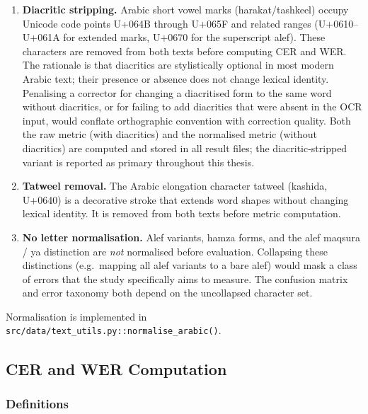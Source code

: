 \begin{enumerate}
  \item \textbf{Diacritic stripping.}
        Arabic short vowel marks (harakat/tashkeel) occupy Unicode code points
        U+064B through U+065F and related ranges (U+0610--U+061A for extended
        marks, U+0670 for the superscript alef).
        These characters are removed from both texts before computing CER and WER.
        The rationale is that diacritics are stylistically optional in most
        modern Arabic text; their presence or absence does not change lexical
        identity.
        Penalising a corrector for changing a diacritised form to the same word
        without diacritics, or for failing to add diacritics that were absent in
        the OCR input, would conflate orthographic convention with correction
        quality.
        Both the raw metric (with diacritics) and the normalised metric (without
        diacritics) are computed and stored in all result files;
        the diacritic-stripped variant is reported as primary throughout this thesis.

  \item \textbf{Tatweel removal.}
        The Arabic elongation character tatweel (kashida, U+0640) is a decorative
        stroke that extends word shapes without changing lexical identity.
        It is removed from both texts before metric computation.

  \item \textbf{No letter normalisation.}
        Alef variants, hamza forms, and the alef maqsura / ya distinction are
        \emph{not} normalised before evaluation.
        Collapsing these distinctions (e.g.\ mapping all alef variants to a
        bare alef) would mask a class of errors that the study specifically
        aims to measure.
        The confusion matrix and error taxonomy both depend on the uncollapsed
        character set.
\end{enumerate}

\noindent
Normalisation is implemented in \texttt{src/data/text\_utils.py::normalise\_arabic()}.

\subsection{CER and WER Computation}
\label{subsec:metrics}

\subsubsection{Definitions}

